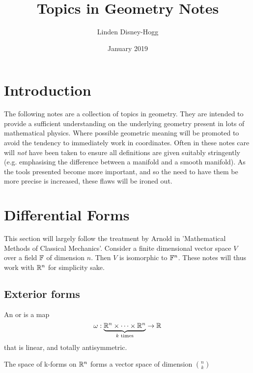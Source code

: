 \documentclass{article}
\title{Topics in Geometry Notes}
\author{Linden Disney-Hogg}
\date{January 2019}
\begin{document}
\maketitle
\tableofcontents

\section{Introduction}
The following notes are a collection of topics in geometry. They are intended to provide a sufficient understanding on the underlying geometry present in lots of mathematical physics. Where possible geometric meaning will be promoted to avoid the tendency to immediately work in coordinates. Often in these notes care will \emph{not} have been taken to ensure all definitions are given suitably stringently (e.g. emphasising the difference between a manifold and a smooth manifold). As the tools presented become more important, and so the need to have them be more precise is increased, these flaws will be ironed out.

\section{Differential Forms}
This section will largely follow the treatment by Arnold in 'Mathematical Methods of Classical Mechanics'. Consider a finite dimensional vector space $V$ over a field $\mathbb{F}$ of dimension $n$. Then $V$ is isomorphic to $\mathbb{F}^n$. These notes will thus work with $\mathbb{R}^n$ for simplicity sake. 

\subsection{Exterior forms}

\begin{definition}[k-form]
An  or  is a map 
\[
\omega : \underbrace{\mathbb{R}^n \times \dots \times \mathbb{R}^n}_{k\text{ times}} \to \mathbb{R}
\]
that is linear, and totally antisymmetric.
\end{definition}

\begin{theorem}
The space of k-forms on $\mathbb{R}^n$ forms a vector space of dimension $\binom{n}{k}$
\end{theorem}
\end{document}
